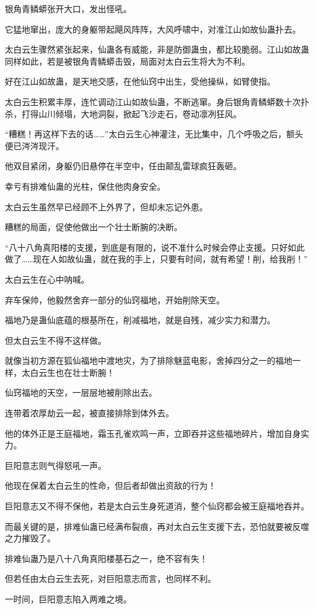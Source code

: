 \begin{this_body}
银角青鳞蟒张开大口，发出怪吼。

它猛地窜出，庞大的身躯带起飓风阵阵，大风呼啸中，对准江山如故仙蛊扑去。

太白云生骤然紧张起来，仙蛊各有威能，非是防御蛊虫，都比较脆弱。江山如故蛊同样如此，若是被银角青鳞蟒击毁，局面对太白云生将大为不利。

好在江山如故蛊，是天地交感，在他仙窍中出生，受他操纵，如臂使指。

太白云生积累丰厚，连忙调动江山如故仙蛊，不断逃窜。身后银角青鳞蟒数十次扑杀，打得山川倾塌，大地洞裂，掀起飞沙走石，卷动凛冽狂风。

“糟糕！再这样下去的话……”太白云生心神灌注，无比集中，几个呼吸之后，额头便已涔涔现汗。

他双目紧闭，身躯仍旧悬停在半空中，任由颠乱雷球疯狂轰砸。

幸亏有排难仙蛊的光柱，保住他肉身安全。

太白云生虽然早已经顾不上外界了，但却未忘记外患。

糟糕的局面，促使他做出一个壮士断腕的决断。

“八十八角真阳楼的支援，到底是有限的，说不准什么时候会停止支援。只好如此做了……现在人如故仙蛊，就在我的手上，只要有时间，就有希望！削，给我削！”

太白云生在心中呐喊。

弃车保帅，他毅然舍弃一部分的仙窍福地，开始削除天空。

福地乃是蛊仙底蕴的根基所在，削减福地，就是自残，减少实力和潜力。

但太白云生不得不这样做。

就像当初方源在狐仙福地中渡地灾，为了排除魅蓝电影，舍掉四分之一的福地一样，太白云生也在壮士断腕！

仙窍福地的天空，一层层地被削除出去。

连带着浓厚劫云一起，被直接排除到体外去。

他的体外正是王庭福地，霜玉孔雀欢鸣一声，立即吞并这些福地碎片，增加自身实力。

巨阳意志则气得怒吼一声。

他现在保着太白云生的性命，但后者却做出资敌的行为！

巨阳意志又不得不保他，若是太白云生身死道消，整个仙窍都会被王庭福地吞并。

而最关键的是，排难仙蛊已经满布裂痕，再对太白云生支援下去，恐怕就要被反噬之力摧毁了。

排难仙蛊乃是八十八角真阳楼基石之一，绝不容有失！

但若任由太白云生去死，对巨阳意志而言，也同样不利。

一时间，巨阳意志陷入两难之境。

\end{this_body}

